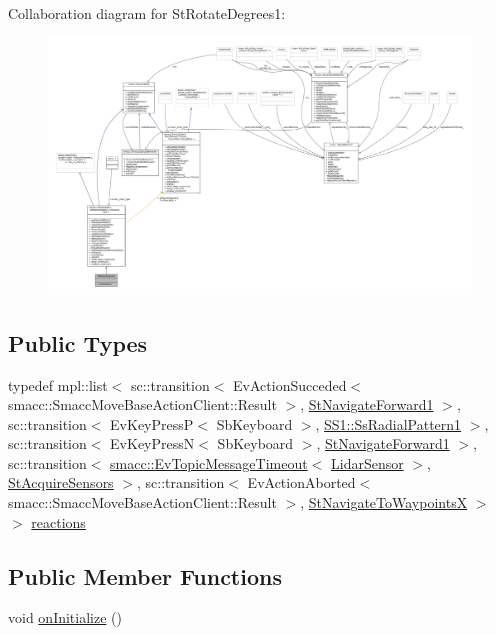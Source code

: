 Collaboration diagram for St\+Rotate\+Degrees1\+:
\nopagebreak
\begin{figure}[H]
\begin{center}
\leavevmode
\includegraphics[width=350pt]{structStRotateDegrees1__coll__graph}
\end{center}
\end{figure}
\subsection*{Public Types}
\begin{DoxyCompactItemize}
\item 
typedef mpl\+::list$<$ sc\+::transition$<$ Ev\+Action\+Succeded$<$ smacc\+::\+Smacc\+Move\+Base\+Action\+Client\+::\+Result $>$, \hyperlink{structStNavigateForward1}{St\+Navigate\+Forward1} $>$, sc\+::transition$<$ Ev\+Key\+PressP$<$ Sb\+Keyboard $>$, \hyperlink{structSS1_1_1SsRadialPattern1}{S\+S1\+::\+Ss\+Radial\+Pattern1} $>$, sc\+::transition$<$ Ev\+Key\+PressN$<$ Sb\+Keyboard $>$, \hyperlink{structStNavigateForward1}{St\+Navigate\+Forward1} $>$, sc\+::transition$<$ \hyperlink{structsmacc_1_1EvTopicMessageTimeout}{smacc\+::\+Ev\+Topic\+Message\+Timeout}$<$ \hyperlink{sensor__state_8h_a9db9e1944f88de79507758d08e4a2ee3}{Lidar\+Sensor} $>$, \hyperlink{structStAcquireSensors}{St\+Acquire\+Sensors} $>$, sc\+::transition$<$ Ev\+Action\+Aborted$<$ smacc\+::\+Smacc\+Move\+Base\+Action\+Client\+::\+Result $>$, \hyperlink{structStNavigateToWaypointsX}{St\+Navigate\+To\+WaypointsX} $>$ $>$ \hyperlink{structStRotateDegrees1_a1733ea4fcde187f315513a60d3465709}{reactions}
\end{DoxyCompactItemize}
\subsection*{Public Member Functions}
\begin{DoxyCompactItemize}
\item 
void \hyperlink{structStRotateDegrees1_a43811c7ec53572baf0c9e6d6fc15909e}{on\+Initialize} ()
\end{DoxyCompactItemize}

